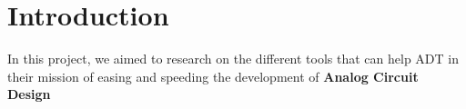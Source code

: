 
\section{Introduction}
\label{sec:Introduction} 

In this project, we aimed to research on the different tools that can help ADT in their mission of easing and speeding the development of \textbf{Analog Circuit Design}

\cite{vural2012analog}